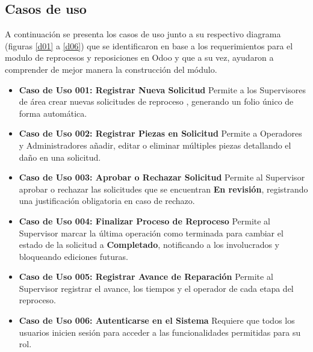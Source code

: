 \documentclass[12pt,letterpaper,spanish]{report}
\begin{document}
\subsection{Casos de uso}
A continuación se presenta los casos de uso junto a su respectivo diagrama (figuras \ref{d01} a \ref{d06}) que se identificaron en base a los requerimientos para el modulo de reprocesos y 
reposiciones en Odoo y que a su vez, ayudaron a comprender de mejor manera la construcción del módulo. 
\begin{itemize}
    \item \textbf{Caso de Uso 001: Registrar Nueva Solicitud} 
    Permite a los Supervisores de área crear nuevas solicitudes de reproceso , generando un folio único de forma automática.

    \item \textbf{Caso de Uso 002: Registrar Piezas en Solicitud} 
    Permite a Operadores y Administradores añadir, editar o eliminar múltiples piezas  detallando el daño en una solicitud.

    \item \textbf{Caso de Uso 003: Aprobar o Rechazar Solicitud}
    Permite al Supervisor aprobar o rechazar las solicitudes que se encuentran \textbf{En revisión}, registrando una justificación obligatoria en caso de rechazo.

    \item \textbf{Caso de Uso 004: Finalizar Proceso de Reproceso}
    Permite al Supervisor marcar la última operación como terminada para cambiar el estado de la solicitud a \textbf{Completado}, notificando a los involucrados y bloqueando ediciones futuras.

    \item \textbf{Caso de Uso 005: Registrar Avance de Reparación} 
    Permite al Supervisor registrar el avance, los tiempos y el operador de cada etapa del reproceso.

    \item \textbf{Caso de Uso 006: Autenticarse en el Sistema} 
    Requiere que todos los usuarios inicien sesión para acceder a las funcionalidades permitidas para su rol.


\end{itemize}
\end{document}
